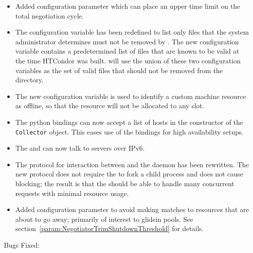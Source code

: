 \begin{itemize}

\item Added configuration parameter 
	which can place an upper time limit on the total negotiation cycle.

\item The configuration variable  has been redefined
to list only files that the system administrator determines must not
be removed by .
The new configuration variable  contains 
a predetermined list of files that are known to be valid at 
the time HTCondor was built. 
 will use the union of these two configuration variables 
as the set of valid files that should not be removed from the 
directory.

\item The new configuration variable 
is used to identify a custom machine resource as offline,
so that the resource will not be allocated to any slot.

\item The python bindings can now accept a list of  hosts
in the constructor of the \texttt{Collector} object.  
This eases use of the bindings for high availability setups.

\item The  and  can now talk to
servers over IPv6.

\item The protocol for interaction between  and the 
 daemon has been rewritten.
The new protocol does not require the  to fork a child process 
and does not cause blocking; 
the result is that the  should be able to handle
many concurrent  requests with minimal resource usage.

\item Added configuration parameter
	 to avoid making matches to
	resources that are about to go away; primarily of interest to glidein
	pools.  See section~\ref{param:NegotiatorTrimShutdownThreshold} for details.


\end{itemize}

\noindent Bugs Fixed:

